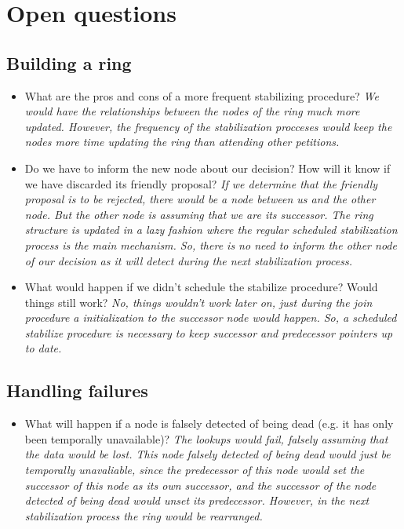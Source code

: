\clearpage
\section{Open questions}

\subsection{Building a ring}
\begin{itemize}
\item What are the pros and cons of a more frequent stabilizing procedure?
\newline \textit{We would have the relationships between the nodes of the ring much more updated. However, the frequency of the stabilization procceses would keep the nodes more time updating the ring than attending other petitions.}
\item  Do we have to inform the new node about our decision? How will it know if we have discarded its friendly proposal?
\newline \textit{If we determine that the friendly proposal is to be rejected, there would be a node between us and the other node. But the other node is assuming that we are its successor. The ring structure is updated in a lazy fashion where the regular scheduled stabilization process is the main mechanism. So, there is no need to inform the other node of our decision as it will detect during the next stabilization process. }

\item  What would happen if we didn’t schedule the stabilize procedure? Would things still work?
\newline \textit{No, things wouldn't work later on, just during the join procedure a initialization to the successor node would happen. So, a scheduled stabilize procedure is necessary to keep successor and predecessor pointers up to date. }
\end{itemize}

\subsection{Handling failures}
\begin{itemize}
\item What will happen if a node is falsely detected of being dead (e.g. it has only been temporally unavailable)?
\newline \textit{The lookups would fail, falsely assuming that the data would be lost. 
\newline This node falsely detected of being dead would just be temporally unavaliable, since the predecessor of this node would set the successor of this node as its own successor, and the successor of the node detected of being dead would unset its predecessor. However, in the next stabilization process the ring would be rearranged.}
\end{itemize}
